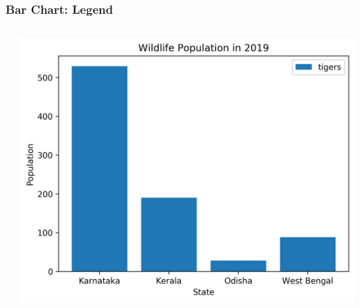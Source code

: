 \documentclass[xcolor={svgnames}]{beamer}
\newcommand{\pyfile}[2][]{}
\begin{document}
\begin{frame}[t,fragile]
    \frametitle{Bar Chart: Legend}
    \vspace{-2mm}
    \begin{columns}[T]
        \begin{column}{0.54\textwidth}
            \pyfile[style=footnotesize]{examples/16-bar-legend.py}
        \end{column}
        \begin{column}{0.46\textwidth}
            \includegraphics[width=\textwidth]{img/16-bar-legend.png}
        \end{column}
    \end{columns}
\end{frame}
\end{document}
